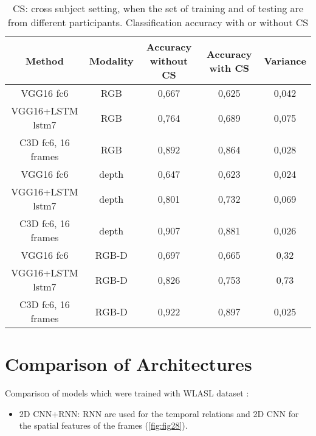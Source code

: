 \documentclass[12pt]{book}
\begin{document}
\begin{table}[!htbp]
\centering
\begin{tabular}{|c|c|c|c|c|}
\hline
\textbf{Method}    & \textbf{Modality} & \textbf{Accuracy without CS} & \textbf{Accuracy with CS} & \textbf{Variance} \\ \hline
VGG16 fc6          & RGB               & 0,667                        & 0,625                     & 0,042             \\ \hline
VGG16+LSTM lstm7   & RGB               & 0,764                        & 0,689                     & 0,075             \\ \hline
C3D fc6, 16 frames & RGB               & 0,892                        & 0,864                     & 0,028             \\ \hline
VGG16 fc6          & depth             & 0,647                        & 0,623                     & 0,024             \\ \hline
VGG16+LSTM lstm7   & depth             & 0,801                        & 0,732                     & 0,069             \\ \hline
C3D fc6, 16 frames & depth             & 0,907                        & 0,881                     & 0,026             \\ \hline
VGG16 fc6          & RGB-D             & 0,697                        & 0,665                     & 0,32              \\ \hline
VGG16+LSTM lstm7   & RGB-D             & 0,826                        & 0,753                     & 0,73              \\ \hline
C3D fc6, 16 frames & RGB-D             & 0,922                        & 0,897                     & 0,025             \\ \hline
\end{tabular}
\caption{CS: cross subject setting, when the set of training and of testing  are from different participants. Classification accuracy with or without CS \cite{EGO2018}}
\label{tab:tab2}
\end{table}

\chapter{Comparison of Architectures}
Comparison of models which were trained with WLASL dataset \cite{DON2020}:
\begin{itemize}
    \item 2D CNN+RNN: RNN are used for the temporal relations and 2D CNN for the spatial features of the frames (\ref{fig:fig28}).
\end{itemize}
\end{document}
